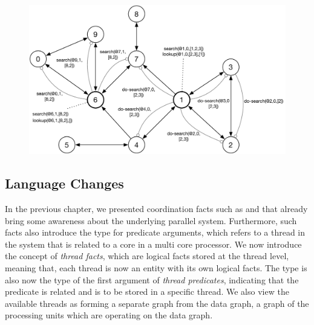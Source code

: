 \begin{figure}[ht]
\begin{center}
   \includegraphics[width=0.9\linewidth]{figures/threads/reach.pdf}
\end{center}


\label{fig:threads:reach_example}
\end{figure}

\subsection{Language Changes}

In the previous chapter, we presented coordination facts such as
 and  that already bring some awareness about
the underlying parallel system. Furthermore, such facts also introduce the
 type for predicate arguments, which refers to a thread in the
system that is related to a core in a multi core processor. We now introduce the
concept of \emph{thread facts}, which are logical facts stored at the thread
level, meaning that, each thread is now an entity with its own logical facts.
The type  is also now the type of the first argument of
\emph{thread predicates}, indicating that the predicate is related and is to be
stored in a specific thread. We also view the available threads as forming a
separate graph from the data graph, a graph of the processing units which are
operating on the data graph.

